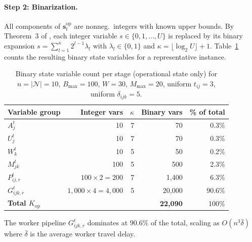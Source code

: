 \documentclass[trsc,nonblindrev]{informs3noheader}
\begin{document}
\paragraph{Step 2: Binarization.}
All components of $\mathbf{s}_t^{\mathrm{op}}$ are nonneg.\ integers with known upper bounds. By Theorem~3 of \citep{zou2019stochastic}, each integer variable $s\in\{0,1,\ldots,U\}$ is replaced by its binary expansion $s=\sum_{l=1}^\kappa 2^{l-1}\lambda_l$ with $\lambda_l\in\{0,1\}$ and $\kappa=\lfloor\log_2 U\rfloor+1$. Table~\ref{tab:binary-op} counts the resulting binary state variables for a representative instance.

\begin{table}[htbp]
\centering
\caption{Binary state variable count per stage (operational state only) for $n=|\mathcal{N}|=10$, $B_{\max}=100$, $W=30$, $M_{\max}=20$, uniform $t_{ij}=3$, uniform $\delta_{ijk}=5$.}
\label{tab:binary-op}
\small
\begin{tabular}{l r r r r}
\hline
\textbf{Variable group} & \textbf{Integer vars} & $\kappa$ &
  \textbf{Binary vars} & \textbf{\% of total}\\
\hline
$A_j^t$       & 10    & 7 & 70       & 0.3\% \\
$U_j^t$       & 10    & 7 & 70       & 0.3\% \\
$W_k^t$       & 10    & 5 & 50       & 0.2\% \\
$M_{jk}^t$    & 100   & 5 & 500      & 2.3\% \\
$P_{ij,r}^t$  & $100\times 2=200$  & 7 & 1{,}400   & 6.3\% \\
$G_{ijk,r}^t$ & $1{,}000\times 4=4{,}000$ & 5 & 20{,}000  & 90.6\% \\
\hline
\textbf{Total $K_{\mathrm{op}}$}
              &       &   & \textbf{22{,}090} & 100\% \\
\hline
\end{tabular}
\end{table}

The worker pipeline $G_{ijk,r}^t$ dominates at $90.6\%$ of the total, scaling as $O(n^3\bar{\delta})$ where $\bar{\delta}$ is the average worker travel delay.
\end{document}
